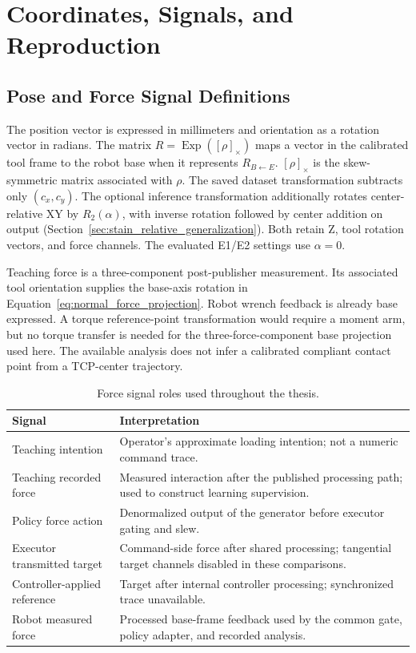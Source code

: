 \appendix
\chapter{Coordinates, Signals, and Reproduction}
\label{chap:appendix}
\label{app:signals}

\section{Pose and Force Signal Definitions}
The position vector is expressed in millimeters and orientation as a rotation vector in radians. The matrix \(R=\operatorname{Exp}([\rho]_\times)\) maps a vector in the calibrated tool frame to the robot base when it represents \(R_{B\leftarrow E}\). \([\rho]_\times\) is the skew-symmetric matrix associated with \(\rho\). The saved dataset transformation subtracts only \((c_x,c_y)\). The optional inference transformation additionally rotates center-relative XY by \(R_2(\alpha)\), with inverse rotation followed by center addition on output (Section~\ref{sec:stain_relative_generalization}). Both retain Z, tool rotation vectors, and force channels. The evaluated E1/E2 settings use \(\alpha=0\).

Teaching force is a three-component post-publisher measurement. Its associated tool orientation supplies the base-axis rotation in Equation~\eqref{eq:normal_force_projection}. Robot wrench feedback is already base expressed. A torque reference-point transformation would require a moment arm, but no torque transfer is needed for the three-force-component base projection used here. The available analysis does not infer a calibrated compliant contact point from a TCP-center trajectory.

\begin{table}[tbp]\centering\small
\caption[Force signal definitions]{Force signal roles used throughout the thesis.}
\label{tab:force_roles}
\begin{tabularx}{\textwidth}{P{0.31\textwidth}X}
\toprule Signal & Interpretation \\ \midrule
Teaching intention & Operator's approximate loading intention; not a numeric command trace. \\
Teaching recorded force & Measured interaction after the published processing path; used to construct learning supervision. \\
Policy force action & Denormalized output of the generator before executor gating and slew. \\
Executor transmitted target & Command-side force after shared processing; tangential target channels disabled in these comparisons. \\
Controller-applied reference & Target after internal controller processing; synchronized trace unavailable. \\
Robot measured force & Processed base-frame feedback used by the common gate, policy adapter, and recorded analysis. \\
\bottomrule
\end{tabularx}
\end{table}

